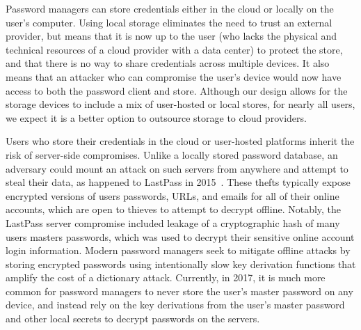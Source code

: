 




 \label{password_storage_vulnerability}
Password managers can store credentials either in the cloud or locally on the user's computer. Using local storage eliminates the need to trust an external provider, but means that it is now up to the user (who lacks the physical and technical resources of a cloud provider with a data center) to protect the store, and that there is no way to share credentials across multiple devices.  It also means that an attacker who can compromise the user's device would now have access to both the password client and store.  Although our design allows for the storage devices to include a mix of user-hosted or local stores, for nearly all users, we expect it is a better option to outsource storage to cloud providers.

Users who store their credentials in the cloud or user-hosted platforms inherit the risk of server-side compromises. Unlike a locally stored password database, an adversary could mount an attack on such servers from anywhere and attempt to steal their data, as happened to LastPass in 2015~\cite{lastpasshack}. These thefts typically expose encrypted versions of users passwords, URLs, and emails for all of their online accounts, which are open to thieves to attempt to decrypt offline. Notably, the LastPass server compromise included leakage of a cryptographic hash of many users masters passwords, which was used to decrypt their sensitive online account login information. Modern password managers seek to mitigate offline attacks by storing encrypted passwords using intentionally slow key derivation functions that amplify the cost of a dictionary attack.  Currently, in 2017, it is much more common for password managers to never store the user's master password on any device, and instead rely on the key derivations from the user's master password and other local secrets to decrypt passwords on the servers. %

